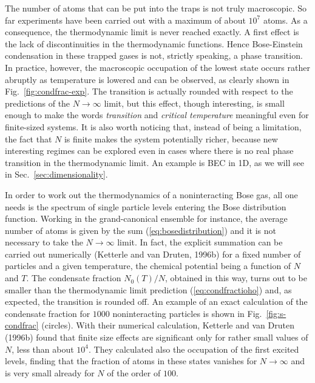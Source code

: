 The number of atoms that can be put into the traps is not truly 
macroscopic. So far experiments have been carried out with a maximum 
of about $10^7$ atoms. As a consequence, the thermodynamic limit is 
never reached exactly. A first effect is the lack of discontinuities 
in the thermodynamic functions. Hence Bose-Einstein condensation in 
these trapped gases is not, strictly speaking, a phase transition. 
In practice, however, the macroscopic  occupation of the lowest state  
occurs rather abruptly as temperature is lowered and can be observed,
as clearly shown in Fig.~\ref{fig:condfrac-exp}.  The transition is 
actually rounded with respect to the  predictions of the $N \to \infty$ 
limit, but this effect, though interesting,  is small enough to 
make the words {\it transition} and {\it critical temperature} 
meaningful even for finite-sized systems. It is also worth noticing 
that, instead of being a limitation, the fact that $N$ is finite  
makes the system potentially richer, because new interesting regimes
can be explored  even in cases where there is no real phase transition 
in the thermodynamic limit. An example is BEC in 1D, as we will see
in Sec.~\ref{sec:dimensionality}. 

In order to work out the thermodynamics of a noninteracting Bose gas, 
all one needs is the spectrum of single particle levels entering the 
Bose distribution function.  Working in the grand-canonical ensemble 
for instance, the average number of atoms is given by the sum 
(\ref{eq:bosedistribution}) and it is not necessary to take the 
$N \to \infty$ limit. In fact, the explicit summation
can be carried out numerically (Ketterle and van Druten, 1996b)
for a fixed number  of particles and a given temperature, the chemical
potential being a function of $N$ and $T$. The condensate fraction
$N_0(T)/N$, obtained in this way, turns out to be smaller than the
thermodynamic limit prediction (\ref{eq:condfractioho}) and, as expected,
the transition is rounded off. An example of an exact calculation of
the condensate fraction for $1000$ noninteracting particles is shown
in Fig.~\ref{fig:s-condfrac} (circles).  With their numerical calculation,
Ketterle and van Druten (1996b) found that  finite size effects are
significant only for rather small values of $N$, less than about $10^4$. 
They calculated  also the occupation  of the first excited levels,
finding that the fraction of atoms in these states vanishes for
$N \to \infty$ and is very small already for $N$ of the order of $100$.

